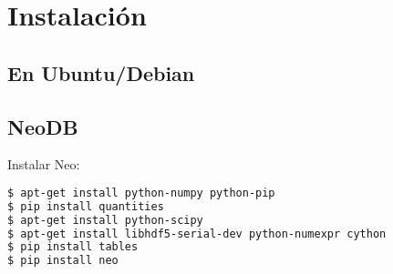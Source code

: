 \documentclass[12pt]{article}
\numberwithin{equation}{section}
\numberwithin{figure}{section}
\numberwithin{table}{section}
\begin{document}
\section{Instalación}

\subsection{En Ubuntu/Debian}

\subsection{NeoDB}
Instalar Neo:

\begin{lstlisting}[style=consola, language=bash]
$ apt-get install python-numpy python-pip
$ pip install quantities
$ apt-get install python-scipy
$ apt-get install libhdf5-serial-dev python-numexpr cython
$ pip install tables
$ pip install neo
\end{lstlisting}
\end{document}

